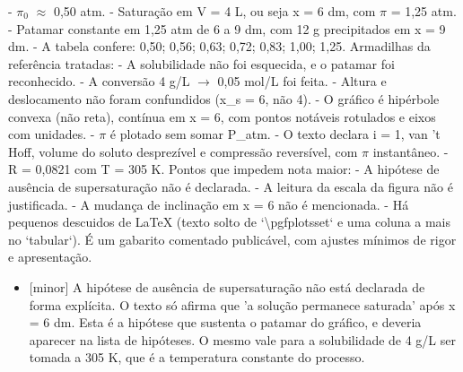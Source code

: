 \documentclass{article}%
\begin{document}
{-} $\pi$$_{0}$ $\approx$ 0,50 atm.\newline%
{-} Saturação em V = 4 L, ou seja x = 6 dm, com $\pi$ = 1,25 atm.\newline%
{-} Patamar constante em 1,25 atm de 6 a 9 dm, com 12 g precipitados em x = 9 dm.\newline%
{-} A tabela confere: 0,50; 0,56; 0,63; 0,72; 0,83; 1,00; 1,25.\newline%
\newline%
Armadilhas da referência tratadas:\newline%
{-} A solubilidade não foi esquecida, e o patamar foi reconhecido.\newline%
{-} A conversão 4 g/L $\to$ 0,05 mol/L foi feita.\newline%
{-} Altura e deslocamento não foram confundidos (x\_s = 6, não 4).\newline%
{-} O gráfico é hipérbole convexa (não reta), contínua em x = 6, com pontos notáveis rotulados e eixos com unidades.\newline%
{-} $\pi$ é plotado sem somar P\_atm.\newline%
{-} O texto declara i = 1, van 't Hoff, volume do soluto desprezível e compressão reversível, com $\pi$ instantâneo.\newline%
{-} R = 0,0821 com T = 305 K.\newline%
\newline%
Pontos que impedem nota maior:\newline%
{-} A hipótese de ausência de supersaturação não é declarada.\newline%
{-} A leitura da escala da figura não é justificada.\newline%
{-} A mudança de inclinação em x = 6 não é mencionada.\newline%
{-} Há pequenos descuidos de LaTeX (texto solto de `\textbackslash{}pgfplotsset` e uma coluna a mais no `tabular`).\newline%
\newline%
É um gabarito comentado publicável, com ajustes mínimos de rigor e apresentação.%
\begin{itemize}%
\item%
{[}minor{]} A hipótese de ausência de supersaturação não está declarada de forma explícita. O texto só afirma que 'a solução permanece saturada' após x = 6 dm. Esta é a hipótese que sustenta o patamar do gráfico, e deveria aparecer na lista de hipóteses. O mesmo vale para a solubilidade de 4 g/L ser tomada a 305 K, que é a temperatura constante do processo.%

\end{itemize}$$
\end{document}
